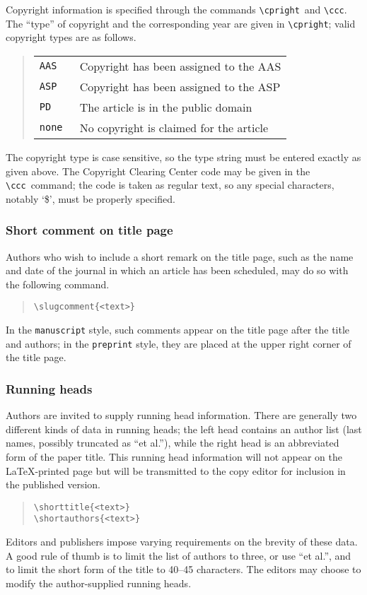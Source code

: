 \documentclass[preprint2]{aastex}
\begin{document}
Copyright information is specified through the commands \verb"\cpright"\ 
and \verb"\ccc".  The ``type'' of copyright and the corresponding year 
are given in \verb"\cpright"; valid copyright types are as follows. 
\begin{quote} 
\begin{tabular}{l@{\quad}p{2.8in}} 
\tt AAS & Copyright has been assigned to the AAS\\[.5ex] 
\tt ASP & Copyright has been assigned to the ASP\\[.5ex] 
\tt PD & The article is in the public domain\\[.5ex] 
\tt none & No copyright is claimed for the article 
\end{tabular} 
\end{quote} 
The copyright type is case sensitive, so the type string must be 
entered exactly as given above. 
The Copyright Clearing Center code may be given in the \verb"\ccc"\ 
command; the code is taken as regular text, so any special characters, 
notably `\$', must be properly specified. 
 
\subsubsection{Short comment on title page} 
 
Authors who wish to include a short remark on the title page, 
such as the name and date of the journal in which an article 
has been scheduled, may do so with the following command. 
\begin{quote} 
\begin{verbatim} 
\slugcomment{<text>} 
\end{verbatim} 
\end{quote} 
In the 
\texttt{manuscript} style, 
such comments appear on the title page after the title and authors; 
in the 
\texttt{preprint} style, 
they are placed at the upper right corner 
of the title page. 
 
\subsubsection{Running heads}\label{shorthead} 
 
Authors are invited to supply running head information. 
There are generally two different kinds of data in running heads; 
the left head contains an author list (last 
names, possibly truncated as ``et al.''), while the right head 
is an abbreviated form of the paper title.  This running head 
information will not appear on the \LaTeX-printed page but will be 
transmitted to the copy editor for inclusion in the published version. 
\begin{quote} 
\begin{verbatim} 
\shorttitle{<text>} 
\shortauthors{<text>} 
\end{verbatim} 
\end{quote} 
Editors and publishers impose varying requirements 
on the brevity of these data.  A good rule of thumb is to limit the list 
of authors to three, or use ``et al.'', and to limit the 
short form of the title to 40--45 characters. 
The editors may choose to modify the author-supplied 
running heads. 
 
\end{document}
